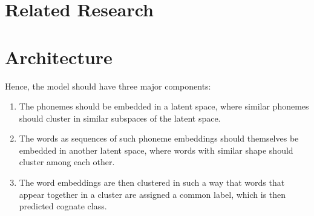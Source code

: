 \documentclass[8pt]{article}
\begin{document}
% 
%
%



\section{Related Research}
\section{Architecture}
Hence, the model should have three major components:
\begin{enumerate}
\item The phonemes should be embedded in a latent space, where similar phonemes should cluster in similar subspaces of the latent space.
\item The words as sequences of such phoneme embeddings should themselves be embedded in another latent space, where words with similar shape should cluster among each other. 
\item The word embeddings are then clustered in such a way that words that appear together in a cluster are assigned a common label, which is then predicted cognate class.
\end{enumerate}
\end{document}
